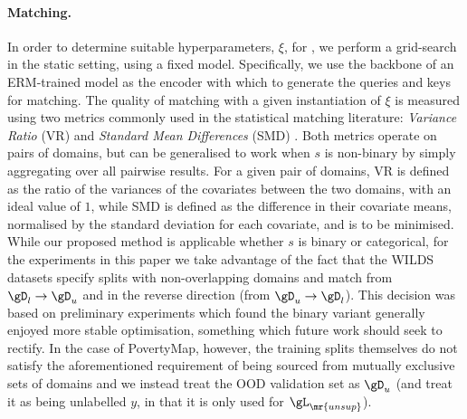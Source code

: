 \paragraph{Matching.}\label{matching_imp} In order to determine suitable hyperparameters, $\xi$, for
\CNN, we perform a grid-search in the static setting, using a fixed model. Specifically, we use the
backbone of an ERM-trained model as the encoder with which to generate the queries and keys for
matching.
%
The quality of matching with a given instantiation of $\xi$ is measured using two metrics commonly
used in the statistical matching literature: \emph{Variance Ratio} (VR) and \emph{Standard Mean
Differences} (SMD) \citep{rubin2001using}. 
%
Both metrics operate on pairs of domains, but can be generalised to work when $s$ is non-binary by
simply aggregating over all pairwise results.
%
For a given pair of domains, VR is defined as the ratio of the variances of the covariates between
the two domains, with an ideal value of $1$, while SMD is defined as the difference in their
covariate means, normalised by the standard deviation for each covariate, and is to be minimised.
%
While our proposed method is applicable whether $s$ is binary or categorical, for the experiments
in this paper we take advantage of the fact that the WILDS datasets specify splits with
non-overlapping domains and match from \( \gD_l \to \gD_u \) and in the reverse direction (from
\( \gD_u \to \gD_l \)). This decision was based on preliminary experiments which found the binary
variant generally enjoyed more stable optimisation, something which future work should seek to
rectify.
%
In the case of PovertyMap, however, the training splits themselves do not satisfy the
aforementioned requirement of being sourced from mutually exclusive sets of domains and we instead
treat the OOD validation set as \( \gD_u \) (and treat it as being unlabelled \wrt{} $y$, in that
it is only used for \( \gL_\mr{unsup} \)).

